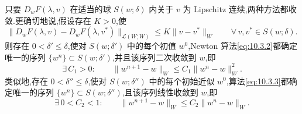只要 \(D_wF(\lambda,v)\) 在适当的球 \(S(w;\delta)\) 内关于 \(v\) 为 Lipschitz 连续,两种方法都收敛.更确切地说,假设存在 \(K>0\),使
\begin{equation}\label{eq:10.3.4}
  \|D_wF(\lambda,v)-D_wF(\lambda,v^*)\|_{\mathcal L(W;W)}
     \le K\|v-v^*\|_W\qquad\forall\,v,v^*\in S(w;\delta).
\end{equation}
则存在 \(0<\delta'\le\delta\),使对 \(S(w;\delta')\) 中的每个初值 \(w^0\),Newton 算法\eqref{eq:10.3.2}都确定唯一的序列 \(\{w^n\}\subset S(w;\delta')\),并且该序列二次收敛到 \(w\),即
\begin{equation}\label{eq:10.3.5}
  \exists\,C_1>0:\qquad\|w^{n+1}-w\|_W\le C_1\|w^n-w\|_W^2.
\end{equation}
类似地,存在 \(0<\delta''\le\delta\),使对 \(S(w;\delta'')\) 中的每个初始近似 \(w^0\),算法\eqref{eq:10.3.3}都确定唯一的序列 \(\{w^n\}\subset S(w;\delta'')\),且该序列线性收敛到 \(w\),即
\begin{equation}\label{eq:10.3.6}
  \exists\,0<C_2<1:\qquad\|w^{n+1}-w\|_W\le C_2\|w^n-w\|_W.
\end{equation}

